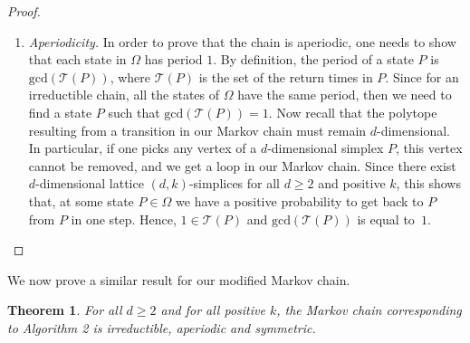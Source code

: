 \documentclass[a4paper,10pt]{article}
\newtheorem{theorem}{Theorem}
\begin{document}
\begin{proof}
\begin{enumerate}[i]
     \item \textit{Aperiodicity.}
     In order to prove that the chain is aperiodic, one needs to show that each state in $\Omega$ has period $1$. By definition, the period of a state $P$ is $\mathrm{gcd}(\mathcal{T}(P))$, where $\mathcal{T}(P)$ is the set of the return times in $P$. Since for an irreductible chain, all the states of $\Omega$ have the same period, then we need to find a state $P$ such that $\mathrm{gcd}(\mathcal{T}(P)) = 1$. Now recall that the polytope resulting from a transition in our Markov chain must remain $d$-dimensional. In particular, if one picks any vertex of a $d$-dimensional simplex $P$, this vertex cannot be removed, and we get a loop in our Markov chain. Since there exist $d$-dimensional lattice $(d,k)$-simplices for all $d\geq2$ and positive $k$, this shows that, at some state $P \in\Omega$ we have a positive probability to get back to $P$ from $P$ in one step.
     Hence, $1\in\mathcal{T}(P)$ and $\mathrm{gcd}(\mathcal{T}(P))$ is equal to~$1$.
   \end{enumerate}
\end{proof}

We now prove a similar result for our modified Markov chain.

\begin{theorem}\label{Thm.Move}
  For all $d\geq2$ and for all positive $k$, the Markov chain corresponding to Algorithm 2 is irreductible, aperiodic and symmetric.
\end{theorem}
\end{document}
